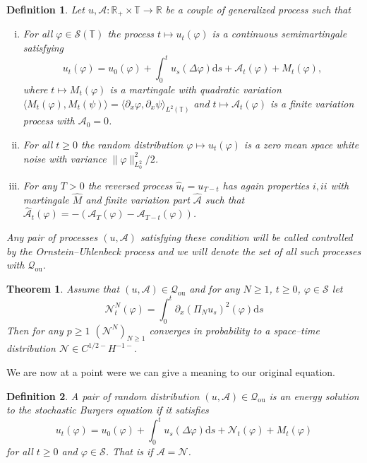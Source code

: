 \documentclass[a4paper,11pt]{article}
\newcommand{\mathd}{\mathrm{d}}
\newcommand{\tmem}[1]{{\em #1\/}}
\newcommand{\tmop}[1]{\ensuremath{\operatorname{#1}}}
\newcommand{\tmtextit}[1]{{\itshape{#1}}}
\newenvironment{enumerateroman}{\begin{enumerate}[i.] }{\end{enumerate}}
\newtheorem{definition}{Definition}
{\theorembodyfont{\rmfamily}\newtheorem{example}{Example}}
{\theorembodyfont{\rmfamily\small}\newtheorem{exercise}{Exercise}}
\newtheorem{theorem}{Theorem}
\newcommand{\CS}{\mathscr{S}}
\begin{document}
\begin{definition}
  Let $u, \mathcal{A}: \mathbb{R}_+ \times \mathbb{T} \rightarrow
  \mathbb{R}$ be a couple of generalized process such that
  \begin{enumerateroman}
    \item For all $\varphi \in \CS (\mathbb{T})$ the process $t \mapsto u_t
    (\varphi)$ is a continuous semimartingale satisfying
    \[ u_t (\varphi) = u_0 (\varphi) + \int_0^t u_s (\Delta \varphi) \mathd s
       +\mathcal{A}_t (\varphi) + M_t (\varphi), \]
    where $t \mapsto M_t (\varphi)$ is a martingale with quadratic variation
    $\langle M_t (\varphi), M_t (\psi) \rangle = \langle \partial_x \varphi,
    \partial_x \psi \rangle_{L^2 (\mathbb{T})}$ and $t \mapsto \mathcal{A}_t
    (\varphi)$ is a finite variation process with $\mathcal{A}_0 = 0$.
    
    \item For all $t \geqslant 0$ the random distribution $\varphi \mapsto u_t
    (\varphi)$ is a zero mean space white noise with variance $\| \varphi
    \|_{L^2_0}^2 / 2$.
    
    \item For any $T > 0$ the reversed process $\hat{u}_t = u_{T - t}$ has
    again properties $i, i i$ with martingale $\hat{M}$ and finite variation
    part $\hat{\mathcal{A}}$ such that $\hat{\mathcal{A}}_t (\varphi) = -
    (\mathcal{A}_T (\varphi) -\mathcal{A}_{T - t} (\varphi))$.
  \end{enumerateroman}
  Any pair of processes $(u, \mathcal{A})$ satisfying these condition will be
  called \tmtextit{controlled by the Ornstein--Uhlenbeck process} and we will
  denote the set of all such processes with $\mathcal{Q}_{\tmop{ou}}$.
\end{definition}

\begin{theorem}
  Assume that $(u, \mathcal{A}) \in \mathcal{Q}_{\tmop{ou}}$ and for any $N
  \geqslant 1$, $t \geqslant 0$, $\varphi \in \CS$ let
  \[ \mathcal{N}_t^N (\varphi) = \int_0^t \partial_x (\Pi_N u_s)^2 (\varphi)
     \mathd s \]
  Then for any $p \geqslant 1$ $(\mathcal{N}^N)_{N \geqslant 1}$ converges in
  probability to a space--time distribution $\mathcal{N} \in C^{1 / 2 -} H^{-
  1 -}$.
\end{theorem}

We are now at a point were we can give a meaning to our original equation.

\begin{definition}
  A pair of random distribution $(u, \mathcal{A}) \in \mathcal{Q}_{\tmop{ou}}$
  is an {\tmem{energy solution}} to the stochastic Burgers equation if it
  satisfies
  \[ u_t (\varphi) = u_0 (\varphi) + \int_0^t u_s (\Delta \varphi) \mathd s
     +\mathcal{N}_t (\varphi) + M_t (\varphi) \]
  for all $t \geqslant 0$ and $\varphi \in \CS$. That is if
  $\mathcal{A}=\mathcal{N}$. 
\end{definition}
\end{document}
